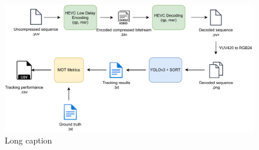 \begin{figure}[!htb]
  \centering
  \includegraphics[width=1.0\linewidth]{img/experiment_pipeline.pdf}
  \caption[Experimental Pipeline]{
  Long caption
  }
  \label{fig:experiment_pipeline}
\end{figure}
